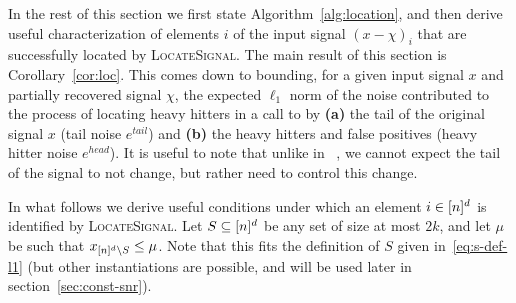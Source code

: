 In the rest of this section we first state Algorithm~\ref{alg:location}, and then derive useful characterization of elements $i$ of the input signal $(x-\chi)_i$ that are successfully located by \textsc{LocateSignal}. The main result of this section is Corollary~\ref{cor:loc}. This comes down to bounding, for a given input signal $x$ and partially recovered signal $\chi$, the expected $\ell_1$ norm of the noise contributed to the process of locating heavy hitters in a call to  by {\bf (a)} the tail of the original signal $x$ (tail noise $e^{tail}$) and {\bf (b)} the heavy hitters and false positives (heavy hitter noise $e^{head}$). It is useful to note that unlike in ~\cite{IK14a}, we cannot expect the tail of the signal to not change, but rather need to control this change. 

In what follows we derive useful conditions under which an element $i\in {[n]^d}$ is identified by \textsc{LocateSignal}. Let $S\subseteq {[n]^d}$ be any set of size at most $2k$, and let $\mu$ be such that $x_{{[n]^d}\setminus S}\leq \mu$. Note that this fits the definition of $S$ given in~\eqref{eq:s-def-l1} (but other instantiations are possible, and will be used later in section~\ref{sec:const-snr}).

